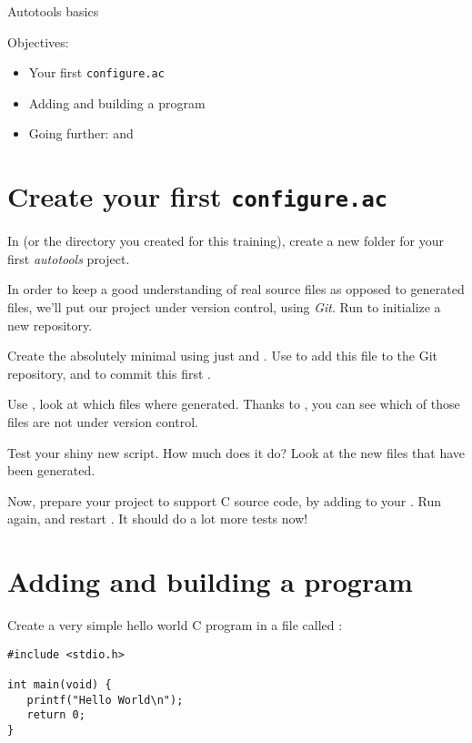\subchapter
{Autotools basics}
{Objectives:
  \begin{itemize}
  \item Your first {\tt configure.ac}
  \item Adding and building a program
  \item Going further:  and 
  \end{itemize}
}

\section{Create your first {\tt configure.ac}}

In  (or the directory you created for this training),
create a new folder  for your first {\em autotools}
project.

In order to keep a good understanding of real source files as opposed
to generated files, we'll put our project under version control, using
{\em Git}. Run  to initialize a new repository.

Create the absolutely minimal  using just
 and . Use 
to add this file to the Git repository, and
 to commit this first
.

Use , look at which files where generated. Thanks
to , you can see which of those files are not under
version control.

Test your shiny new  script. How much does it do? Look
at the new files that have been generated.

Now, prepare your project to support C source code, by adding
 to your . Run
 again, and restart . It should
do a lot more tests now!

\section{Adding and building a program}

Create a very simple hello world C program in a file called
:

\begin{verbatim}
#include <stdio.h>

int main(void) {
   printf("Hello World\n");
   return 0;
}
\end{verbatim}

